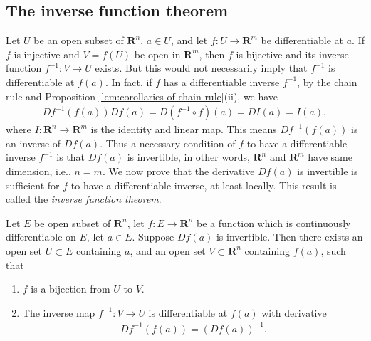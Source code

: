 \subsection{The inverse function theorem}

Let $U$ be an open subset of $\mathbf{R}^n$, $a \in U$, and let $f : U \to \mathbf{R}^m$ be differentiable at $a$. If $f$ is injective and $V = f(U)$ be open in $\mathbf{R}^m$, then $f$ is bijective and its inverse function $f^{-1} : V \to U$ exists. But this would not necessarily imply that $f^{-1}$ is differentiable at $f(a)$. In fact, if $f$ has a differentiable inverse $f^{-1}$, by the chain rule and Proposition \ref{lem:corollaries of chain rule}(ii), we have
    \begin{align*}
        Df^{-1}(f(a))Df(a)
        = D(f^{-1} \circ f)(a)
        = DI(a)
        = I(a),
    \end{align*}
where $I : \mathbf{R}^n \to \mathbf{R}^m$ is the identity and linear map. This means $Df^{-1}(f(a))$ is an inverse of $Df(a)$. Thus a necessary condition of $f$ to have a differentiable inverse $f^{-1}$ is that $Df(a)$ is invertible, in other words, $\mathbf{R}^n$ and $\mathbf{R}^m$ have same dimension, i.e., $n = m$. We now prove that the derivative $Df(a)$ is invertible is sufficient for $f$ to have a differentiable inverse, at least locally. This result is called the \emph{inverse function theorem}.

\begin{theorem}
    Let $E$ be open subset of $\mathbf{R}^n$, let $f : E \to \mathbf{R}^n$ be a function which is continuously differentiable on $E$, let $a \in E$. Suppose $Df(a)$ is invertible. Then there exists an open set $U \subset E$ containing $a$, and an open set $V \subset \mathbf{R}^n$ containing $f(a)$, such that
    \begin{enumerate}
        \item $f$ is a bijection from $U$ to $V$.
        \item The inverse map $f^{-1} : V \to U$ is differentiable at $f(a)$ with derivative
        \begin{align*}
            Df^{-1}(f(a)) = (Df(a))^{-1}.
        \end{align*}
    \end{enumerate}
\end{theorem}

